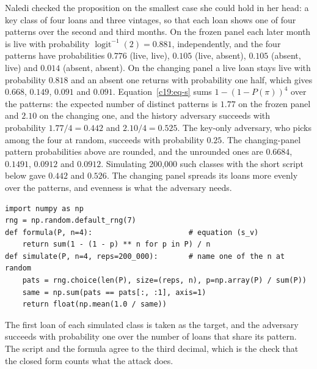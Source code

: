 \begin{example}\label{c19:ex-count}
Naledi checked the proposition on the
smallest case she could hold in her head: a key class of four loans and three vintages, so
that each loan shows one of four patterns over the second and third months. On the frozen
panel each later month is live with probability $\operatorname{logit}^{-1}(2)=0.881$, independently, and the
four patterns have probabilities $0.776$ (live, live), $0.105$ (live, absent), $0.105$ (absent, live) and
$0.014$ (absent, absent). On the changing panel a live loan stays live with probability $0.818$
and an absent one returns with probability one half, which gives $0.668$, $0.149$, $0.091$ and $0.091$.
Equation~\eqref{c19:eq-s} sums $1-(1-P(\pi))^4$ over the patterns: the expected number of distinct
patterns is $1.77$ on the frozen panel and $2.10$ on the changing one, and the history adversary
succeeds with probability $1.77/4=0.442$ and $2.10/4=0.525$. The key-only adversary, who
picks among the four at random, succeeds with probability $0.25$. The changing-panel pattern probabilities above are rounded, and the unrounded ones are $0.6684$, $0.1491$, $0.0912$ and $0.0912$.
Simulating 200,000 such classes with the short script below gave $0.442$ and $0.526$. The changing panel spreads
its loans more evenly over the patterns, and evenness is what the adversary needs.
\begin{lstlisting}
import numpy as np
rng = np.random.default_rng(7)
def formula(P, n=4):                      # equation (s_v)
    return sum(1 - (1 - p) ** n for p in P) / n
def simulate(P, n=4, reps=200_000):       # name one of the n at random
    pats = rng.choice(len(P), size=(reps, n), p=np.array(P) / sum(P))
    same = np.sum(pats == pats[:, :1], axis=1)
    return float(np.mean(1.0 / same))
\end{lstlisting}
The first loan of each simulated class is taken as the target, and the adversary succeeds with probability one over the number of loans that share its pattern. The script and the formula agree to the third decimal, which is the check that the closed form counts what the attack does.
\end{example}

